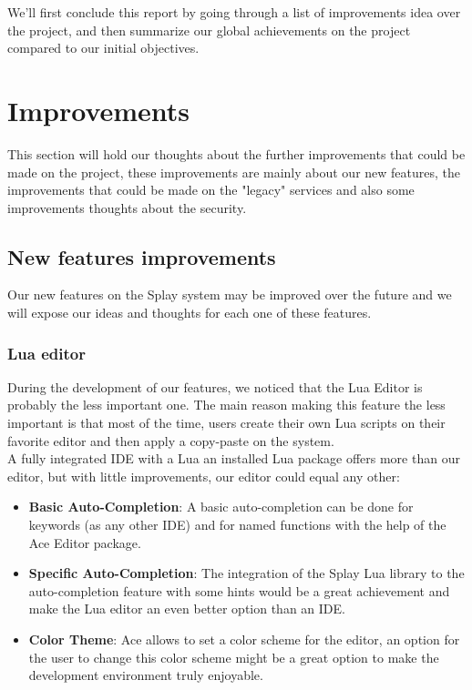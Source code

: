 \documentclass{eplmastersthesis}
\begin{document}
    We'll first conclude this report by going through a list of improvements
    idea over the project, and then summarize our global achievements on the
    project compared to our initial objectives.

    \section{Improvements}

      This section will hold our thoughts about the further improvements
      that could be made on the project, these improvements are mainly about
      our new features, the improvements that could be made on the "legacy"
      services and also some improvements thoughts about the security.

      \subsection{New features improvements}

        Our new features on the Splay system may be improved over the future
        and we will expose our ideas and thoughts for each one of these
        features.

        \subsubsection{Lua editor}

        During the development of our features, we noticed that the Lua Editor
        is probably the less important one. The main reason making this feature
        the less important is that most of the time, users create their own Lua
        scripts on their favorite editor and then apply a copy-paste on the
        system.\\
        A fully integrated IDE with a Lua an installed Lua package offers more
        than our editor, but with little improvements, our editor could equal
        any other:

        \begin{itemize}
          \item \textbf{Basic Auto-Completion}: A basic auto-completion can be
          done for keywords (as any other IDE) and for named functions with
          the help of the Ace Editor package.
          \item \textbf{Specific Auto-Completion}: The integration of the Splay
          Lua library to the auto-completion feature with some hints would
          be a great achievement and make the Lua editor an even better
          option than an IDE.
          \item \textbf{Color Theme}: Ace allows to set a color scheme for
          the editor, an option for the user to change this color scheme
          might be a great option to make the development environment
          truly enjoyable.
        \end{itemize}
\end{document}
